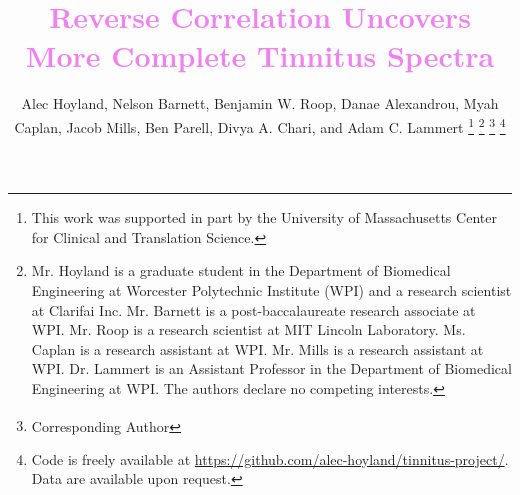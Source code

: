 \documentclass[journal]{IEEEtran}
\begin{document}
%
\title{\textcolor{violet}{Reverse Correlation Uncovers More Complete Tinnitus Spectra \vspace{0.25cm}}}

%
%
%

\author{Alec Hoyland, Nelson Barnett, Benjamin W. Roop, Danae Alexandrou, Myah Caplan, Jacob Mills, Ben Parell, Divya A. Chari, and Adam C. Lammert\textsuperscript{\textdagger{}}%
\thanks{This work was supported in part by the University of Massachusetts
Center for Clinical and Translation Science.}%
\thanks{Mr. Hoyland is a graduate student in the Department of Biomedical Engineering
at Worcester Polytechnic Institute (WPI) and a research scientist at Clarifai Inc.
Mr. Barnett is a post-baccalaureate research associate at WPI.
Mr. Roop is a research scientist at MIT Lincoln Laboratory.
Ms. Caplan is a research assistant at WPI.
Mr. Mills is a research assistant at WPI.
Dr. Lammert is an Assistant Professor in the Department of Biomedical Engineering at WPI.
The authors declare no competing interests.}%
\thanks{\textsuperscript{\textdagger{}} Corresponding Author}%
\thanks{Code is freely available at \protect\url{https://github.com/alec-hoyland/tinnitus-project/}.
Data are available upon request.}}
\end{document}
